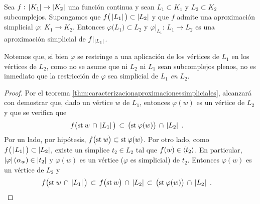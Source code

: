 \begin{coroAproximacionInducidaEnSubcomplejos}%
	\label{thm:aproximacioninducidaensubcomplejos}
	Sea $f:\,\left|K_{1}\right|\rightarrow\left|K_{2}\right|$ una funci\'{o}n
	continua y sean $L_{1}\subset K_{1}$ y $L_{2}\subset K_{2}$
	subcomplejos. Supongamos que
	$f\big(\left|L_{1}\right|\big)\subset\left|L_{2}\right|$ y que $f$ admite
	una aproximaci\'{o}n simplicial $\varphi:\,K_{1}\rightarrow K_{2}$.
	Entonces $\varphi\big(L_{1}\big)\subset L_{2}$ y
	$\varphi|_{L_{1}}:\,L_{1}\rightarrow L_{2}$ es una aproximaci\'{o}n
	simplicial de $f|_{\left|L_{1}\right|}$.
\end{coroAproximacionInducidaEnSubcomplejos}

Notemos que, si bien $\varphi$ se restringe a una aplicaci\'{o}n de los
v\'{e}rtices de $L_{1}$ en los v\'{e}rtices de $L_{2}$, como no se asume
que ni $L_{2}$ ni $L_{1}$ sean subcomplejos plenos, no es inmediato que
la restricci\'{o}n de $\varphi$ sea simplicial de $L_{1}$ \emph{en} $L_{2}$.

\begin{proof}
	Por el teorema \ref{thm:caracterizacionaproximacionessimpliciales},
	alcanzar\'{a} con demostrar que, dado un v\'{e}rtice $w$ de $L_{1}$,
	entonces $\varphi(w)$ es un v\'{e}rtice de $L_{2}$ y que se verifica
	que
	\begin{align*}
		f\big(\mathrm{st}_{}\,w\,\cap\,\left|L_{1}\right|\big) & \,\subset\,
			\big(\mathrm{st}_{}\,\varphi(w)\big)\,\cap\,\left|L_{2}\right|
		\text{ .}
	\end{align*}
	Por un lado, por hip\'{o}tesis,
	$f\big(\mathrm{st}_{}\,w\big)\subset\mathrm{st}_{}\,\varphi(w)$. Por otro lado,
	como $f\big(\left|L_{1}\right|\big)\subset\left|L_{2}\right|$, existe un
	s\'{\i}mplice $t_{2}\in L_{2}$ tal que $f(w)\in\langle t_{2}\rangle$.
	En particular, $\left|\varphi\right|(\alpha_{w})\in\left|t_{2}\right|$ y
	$\varphi(w)$ es un v\'{e}rtice ($\varphi$ es simplicial) de $t_{2}$.
	Entonces $\varphi(w)$ es un v\'{e}rtice de $L_{2}$ y
	\begin{align*}
		f\big(\mathrm{st}_{}\,w\,\cap\,\left|L_{1}\right|\big) & \,\subset\,
			f\big(\mathrm{st}_{}\,w\big)\,\cap\,\left|L_{2}\right| \,\subset\,
			\big(\mathrm{st}_{}\,\varphi(w)\big)\,\cap\,\left|L_{2}\right|
		\text{ .}
	\end{align*}
\end{proof}

